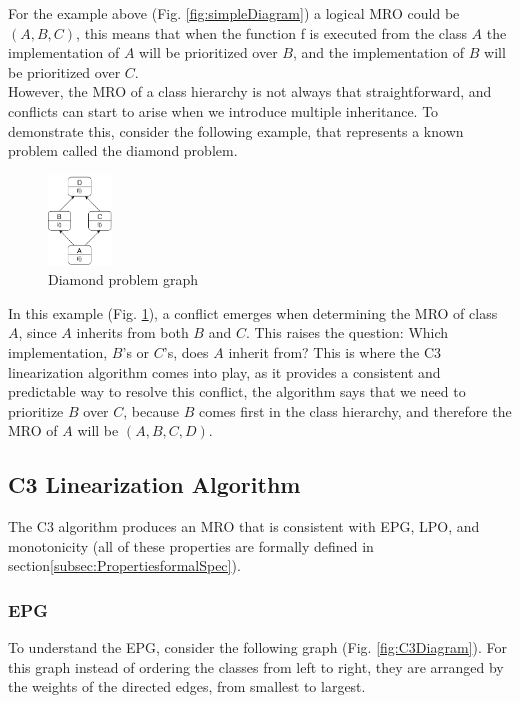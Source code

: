 \documentclass[runningheads]{llncs}
\begin{document}
For the example above (Fig. \ref{fig:simpleDiagram}) a logical MRO could be $(A, B, C)$, this means that when the function f is executed from the class $A$ the implementation of $A$ will be prioritized over $B$, and the implementation of $B$ will be prioritized over $C$.\\
However, the MRO of a class hierarchy is not always that straightforward, and conflicts can start to arise when we introduce multiple inheritance.
To demonstrate this, consider the following example, that represents a known problem called the diamond problem\autocite{mondayezeStudiesObjectorientedProgramming2021}.
\begin{figure}[htbp]
  \centering
  \includegraphics[width=0.15\textwidth]{images/DiamondProblem.png}
  \caption{Diamond problem graph}
  \label{fig:DiamondProblem}
\end{figure}

In this example (Fig. \ref{fig:DiamondProblem}), a conflict emerges when determining the MRO of class $A$, since $A$ inherits from both $B$ and $C$. This raises the question: Which implementation, $B$'s or $C$'s, does $A$ inherit from? 
This is where the C3 linearization algorithm comes into play, as it provides a consistent and predictable way to resolve this conflict, the algorithm says that we need to prioritize $B$ over $C$, because $B$ comes first in the class hierarchy, and therefore the MRO of $A$ will be $(A, B, C, D)$.

\subsection{C3 Linearization Algorithm}
\label{subsec:C3Linearization}
The C3 algorithm produces an MRO that is consistent with EPG, LPO, and monotonicity\autocite{barrettMonotonicSuperclassLinearization1996} (all of these properties are formally defined in section\ref{subsec:PropertiesformalSpec}).

\subsubsection{EPG}
To understand the EPG, consider the following graph (Fig. \ref{fig:C3Diagram}). For this graph instead of ordering the classes from left to right,
 they are arranged by the weights of the directed edges, from smallest to largest.
\end{document}

